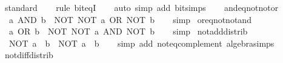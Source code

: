 \begin{isabellebody}
\endisadelimproof
%
\isatagproof
{}\isamarkupfalse%
\ standard\isanewline
\ \ \isamarkupfalse%
\ {\isacharparenleft}{\kern0pt}rule\ bit{\isacharunderscore}{\kern0pt}eqI{\isacharparenright}{\kern0pt}\isanewline
\ \ \isamarkupfalse%
\ {\isacharparenleft}{\kern0pt}auto\ simp\ add{\isacharcolon}{\kern0pt}\ bit{\isacharunderscore}{\kern0pt}simps{\isacharparenright}{\kern0pt}\isanewline
\ \ \isamarkupfalse%
%
\endisatagproof
{\isafoldproof}%
%
\isadelimproof
\isanewline
%
\endisadelimproof
\isanewline
{}\isamarkupfalse%
\ and{\isacharunderscore}{\kern0pt}eq{\isacharunderscore}{\kern0pt}not{\isacharunderscore}{\kern0pt}not{\isacharunderscore}{\kern0pt}or{\isacharcolon}{\kern0pt}\isanewline
\ \ {\isacartoucheopen}a\ AND\ b\ {\isacharequal}{\kern0pt}\ NOT\ {\isacharparenleft}{\kern0pt}NOT\ a\ OR\ NOT\ b{\isacharparenright}{\kern0pt}{\isacartoucheclose}\isanewline
%
\isadelimproof
\ \ %
\endisadelimproof
%
\isatagproof
{}\isamarkupfalse%
\ simp%
\endisatagproof
{\isafoldproof}%
%
\isadelimproof
\isanewline
%
\endisadelimproof
\isanewline
{}\isamarkupfalse%
\ or{\isacharunderscore}{\kern0pt}eq{\isacharunderscore}{\kern0pt}not{\isacharunderscore}{\kern0pt}not{\isacharunderscore}{\kern0pt}and{\isacharcolon}{\kern0pt}\isanewline
\ \ {\isacartoucheopen}a\ OR\ b\ {\isacharequal}{\kern0pt}\ NOT\ {\isacharparenleft}{\kern0pt}NOT\ a\ AND\ NOT\ b{\isacharparenright}{\kern0pt}{\isacartoucheclose}\isanewline
%
\isadelimproof
\ \ %
\endisadelimproof
%
\isatagproof
{}\isamarkupfalse%
\ simp%
\endisatagproof
{\isafoldproof}%
%
\isadelimproof
\isanewline
%
\endisadelimproof
\isanewline
{}\isamarkupfalse%
\ not{\isacharunderscore}{\kern0pt}add{\isacharunderscore}{\kern0pt}distrib{\isacharcolon}{\kern0pt}\isanewline
\ \ {\isacartoucheopen}NOT\ {\isacharparenleft}{\kern0pt}a\ {\isacharplus}{\kern0pt}\ b{\isacharparenright}{\kern0pt}\ {\isacharequal}{\kern0pt}\ NOT\ a\ {\isacharminus}{\kern0pt}\ b{\isacartoucheclose}\isanewline
%
\isadelimproof
\ \ %
\endisadelimproof
%
\isatagproof
{}\isamarkupfalse%
\ {\isacharparenleft}{\kern0pt}simp\ add{\isacharcolon}{\kern0pt}\ not{\isacharunderscore}{\kern0pt}eq{\isacharunderscore}{\kern0pt}complement\ algebra{\isacharunderscore}{\kern0pt}simps{\isacharparenright}{\kern0pt}%
\endisatagproof
{\isafoldproof}%
%
\isadelimproof
\isanewline
%
\endisadelimproof
\isanewline
{}\isamarkupfalse%
\ not{\isacharunderscore}{\kern0pt}diff{\isacharunderscore}{\kern0pt}distrib{\isacharcolon}{\kern0pt}\isanewline

\end{isabellebody}
